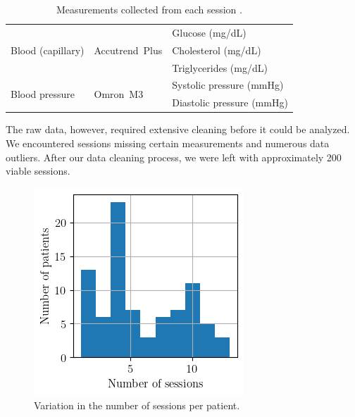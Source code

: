 \begin{table}[h]
\begin{tabular}{ l l l }
		\midrule

		\multirow{3}{*}{Blood (capillary)} & \multirow{3}{4cm}{Accutrend\textregistered\ Plus}                                              & Glucose (mg/dL)                           \\
		                                   &                                                                                                & Cholesterol (mg/dL)                       \\
		                                   &                                                                                                & Triglycerides (mg/dL)                     \\

		\midrule

		\multirow{2}{*}{Blood pressure}    & \multirow{2}{4cm}{Omron\textregistered\ M3}                                                    & Systolic pressure (mmHg)                  \\
		                                   &

		                                   & Diastolic pressure (mmHg)                                                                                                                  \\
		\bottomrule

	\end{tabular}
	\caption{Measurements collected from each session \citep{10045_124160}.}
\end{table}

The raw data, however, required extensive cleaning before it could be analyzed.
We encountered sessions missing certain measurements and numerous data
outliers. After our data cleaning process, we were left with approximately 200
viable sessions.

\begin{figure}[h]
	\centering
	\includegraphics{files/sessions_per_patient}
	\caption{Variation in the number of sessions per patient.}
	\label{fig:sessions-per-patient}
\end{figure}

